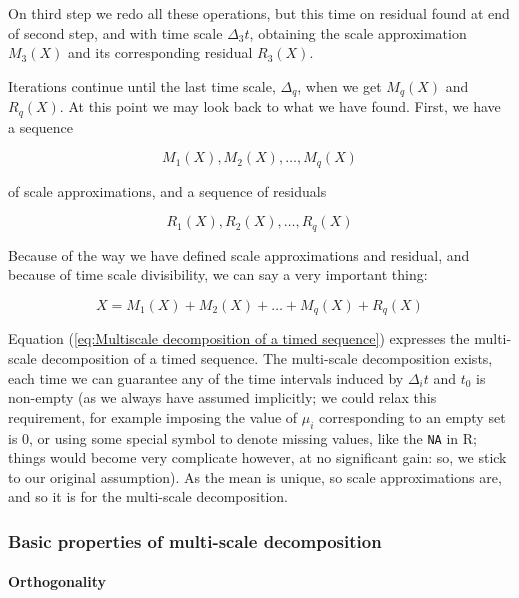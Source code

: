 \documentclass[a4paper,10pt]{book}
\begin{document}
On third step we redo all these operations, but this time on residual found at end of second step, and with time scale $\Delta_{3} t$, obtaining the scale approximation $M_{3}(X)$ and its corresponding residual $R_{3}(X)$.

Iterations continue until the last time scale, $\Delta_{q}$, when we get $M_{q}(X)$ and $R_{q}(X)$. At this point we may look back to what we have found. First, we have a sequence

\begin{equation}
	M_{1}(X), M_{2}(X), \ldots, M_{q}(X)
\end{equation}

\noindent of scale approximations, and a sequence of residuals

\begin{equation}
	R_{1}(X), R_{2}(X), \ldots, R_{q}(X)
\end{equation}

Because of the way we have defined scale approximations and residual, and because of time scale divisibility, we can say a very important thing:

\begin{equation}\label{eq:Multiscale decomposition of a timed sequence}
	X = M_{1}(X) + M_{2}(X) + \ldots + M_{q}(X) + R_{q}(X)
\end{equation}

Equation (\ref{eq:Multiscale decomposition of a timed sequence}) expresses the multi-scale decomposition of a timed sequence. The multi-scale decomposition exists, each time we can guarantee any of the time intervals induced by $\Delta_{i} t$ and $t_{0}$ is non-empty (as we always have assumed implicitly; we could relax this requirement, for example imposing the value of $\mu_{i}$ corresponding to an empty set is 0, or using some special symbol to denote missing values, like the \verb|NA| in R; things would become very complicate however, at no significant gain: so, we stick to our original assumption). As the mean is unique, so scale approximations are, and so it is for the multi-scale decomposition.

\subsubsection{Basic properties of multi-scale decomposition}
\paragraph{Orthogonality}
\end{document}
